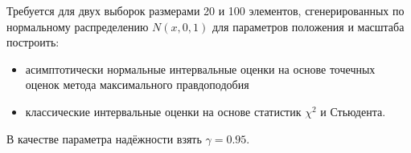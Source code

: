 \item Требуется для двух выборок размерами 20 и 100 элементов, сгенерированных по нормальному распределению $N(x, 0, 1)$ для параметров положения и масштаба построить:
\begin{itemize}
	\item асимптотически нормальные интервальные оценки на основе точечных оценок метода максимального правдоподобия
	\item классические интервальные оценки на основе статистик $\chi^2$ и Стьюдента.
\end{itemize} 

В качестве параметра надёжности взять $\gamma = 0.95$.